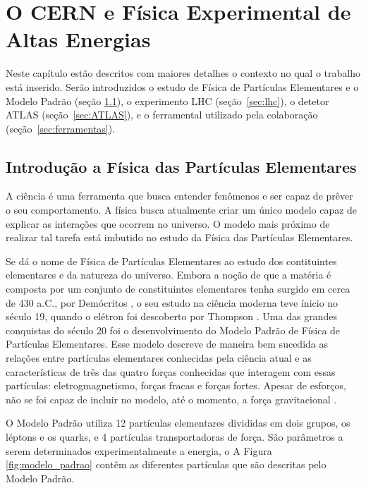 \chapter{O CERN e Física Experimental de Altas Energias}

Neste capítulo estão descritos com maiores detalhes o contexto no qual o
trabalho está inserido. Serão introduzidos o estudo de Física de Partículas
Elementares e o Modelo Padrão (seção \ref{sec:fis_part}),
 o experimento LHC (seção~\ref{sec:lhc}), o detetor ATLAS 
(seção~\ref{sec:ATLAS}), e o ferramental utilizado pela colaboração
(seção~\ref{sec:ferramentas}). 

\section{Introdução a Física das Partículas Elementares}
\label{sec:fis_part}

A ciência é uma ferramenta que busca entender fenômenos e ser capaz de
prêver o seu comportamento. A física busca atualmente criar um único 
modelo capaz de explicar as interações que ocorrem no universo. O modelo mais
próximo de realizar tal tarefa está imbutido no estudo da Física das
Partículas Elementares. 

Se dá o nome de Física de Partículas Elementares ao estudo dos contituintes
elementares e da natureza do universo. Embora a noção de que a matéria é
composta por um conjunto de constituintes elementares tenha surgido em cerca de
430 a.C., por Demócritos \cite{democritos}, o seu estudo na ciência moderna teve ínicio no século
19, quando o elétron foi descoberto por Thompson \cite{eletron}.
Uma das grandes conquistas do século 20 foi o desenvolvimento do Modelo Padrão
de Física de Partículas Elementares. 
Esse modelo descreve de maneira bem
sucedida as relações entre
partículas elementares conhecidas pela ciência atual \cite{introduction_particle_physics} e as características de
três das quatro forças conhecidas que interagem com essas partículas:
eletrogmagnetismo, forças fracas e forças fortes. Apesar de esforços, não se 
foi capaz de incluir no modelo, até o momento, a força gravitacional \cite{natureza_do_universo}.

O Modelo Padrão utiliza 12 partículas elementares divididas em dois grupos, os
léptons e os quarks, e 4 partículas transportadoras de força. São parâmetros a
serem determinados experimentalmente a energia, o
A Figura \ref{fig:modelo_padrao} contêm as diferentes partículas que são
descritas pelo Modelo Padrão.

